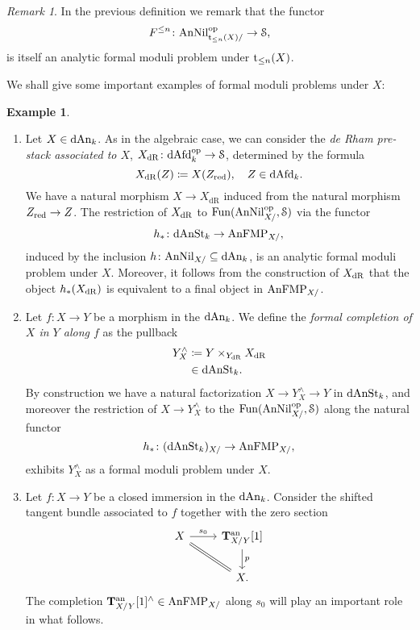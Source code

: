 \documentclass[10pt,a4paper,reqno]{amsart} %
\theoremstyle{plain}
\theoremstyle{definition}
\newtheorem{eg}[thm]{Example}
\theoremstyle{remark}
\newtheorem{rem}[thm]{Remark}
\numberwithin{equation}{section}
\begin{document}
\begin{rem}
    In the previous definition we remark that the functor
        \[
            F^{\le n} \colon \mathrm{AnNil}^\mathrm{op}_{\mathrm t_{\le n}(X)/ } \to \mathcal S,  
        \]
    is itself an analytic formal moduli problem under $\mathrm t_{\le n}(X)$.
\end{rem}

We shall give some important examples of formal moduli problems under $X$:

\begin{eg}
    \begin{enumerate}
        \item Let $X \in \mathrm{dAn}_k$. As in the algebraic case, we can consider the \emph{de Rham pre-stack associated to $X$}, $X_\mathrm{dR} \colon \mathrm{dAfd}_k^\mathrm{op} \to \mathcal S$,
        determined by the formula
            \[
                X_{\mathrm{dR}}(Z) \coloneqq X(Z_{\mathrm{red}}), \quad Z \in \mathrm{dAfd}_k.  
            \]
        We have a natural morphism $X \to X_\mathrm{dR}$ induced from the natural morphism $Z_{\mathrm{red}} \to Z$.
        The restriction of $X_{\mathrm{dR}}$ to $\operatorname{Fun}(\mathrm{AnNil}^\mathrm{op}_{X/ }, \mathcal S)$ via the functor
            \[
                h_* \colon \mathrm{dAnSt}_k \to \mathrm{AnFMP}_{X/ },
            \]
        induced by the inclusion $h \colon \mathrm{AnNil}_{X/ } \subseteq \mathrm{dAn}_k$, is an analytic formal moduli problem under $X$.
        Moreover, it follows from the construction of $X_{\mathrm{dR}}$ that the object $h_* (X_{\mathrm{dR}})$ is equivalent to a final object in $\mathrm{AnFMP}_{X/ }$.
        \item Let $f \colon X \to Y$ be a morphism in the \infcat $\mathrm{dAn}_k$. We define the \emph{formal completion of $X$ in $Y$ along $f$} as the pullback 
            \begin{align*}
                Y^\wedge_X  & \coloneqq Y \times_{Y_\mathrm{dR}} X_\mathrm{dR} \\
                            & \in \mathrm{dAnSt}_k.
            \end{align*}
        By construction we have a natural factorization $X \to Y^\wedge_X \to Y$ in $\mathrm{dAnSt}_k$, and moreover the restriction of $X \to Y^\wedge_X$ to the \infcat
        $\operatorname{Fun}(\mathrm{AnNil}^\mathrm{op}_{X/}, \mathcal S)$ along the natural functor
            \[
                h_* \colon  (\mathrm{dAnSt}_k)_{X/ } \to \mathrm{AnFMP}_{X/ },  
            \]
        exhibits $Y^\wedge_X$ as a formal moduli problem under $X$.
        \item Let $f \colon X \to Y$ be a closed immersion in the \infcat $\mathrm{dAn}_k$. Consider the shifted tangent bundle associated to $f$ together with the zero section
            \[
            \begin{tikzcd}
                X \ar{r}{s_0} \arrow[rd, equal] & \bT\an_{X/ Y}[1] \ar{d}{p} \\
                    & X.
            \end{tikzcd}
            \]
        The completion $\mathbf T^\mathrm{an}_{X/Y} [1]^\wedge \in \mathrm{AnFMP}_{X/ }$ along $s_0$ will play an important role in what follows.
    \end{enumerate}
\end{eg}
\end{document}
